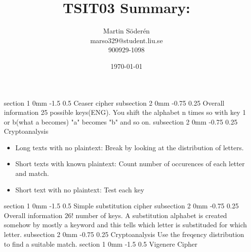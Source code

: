 \documentclass[a4paper,11pt]{article}
\makeatletter
\renewcommand{\section}{\@startsection
   {section}%
   {1}%
   {0mm}%
   {-1.5\baselineskip}%
   {0.5\baselineskip}%
   {\sffamily\bfseries\upshape\normalsize}}%
\renewcommand{\subsection}{\@startsection
   {subsection}%
   {2}%
   {0mm}%
   {-0.75\baselineskip}%
   {0.25\baselineskip}%
   {\rmfamily\normalfont\slshape\normalsize}}%
\makeatother
\begin{document}
\begin{titlepage}
\title{TSIT03 Summary:}
\author{Martin Söderén\\ marso329@student.liu.se\\900929-1098}
\date{\today}
\maketitle
\vfill %
\thispagestyle{empty}
\end{titlepage}
\section{Ceaser cipher}
\subsection{Overall information}
25 possible keys(ENG). You shift the alphabet n times so with key 1 or b(what a becomes) "a" becomes "b" and so on.
\subsection{Cryptoanalysis}
\begin{itemize}
\item Long texts with no plaintext: Break by looking at the distribution of letters. 
\item Short texts with known plaintext: Count number of occurences of each letter and match.
\item Short text with no plaintext: Test each key
\end{itemize}

\section{Simple substitution cipher}
\subsection{Overall information}
$26!$ number of keys. A substitution alphabet is created somehow by mostly a keyword and this tells which letter is substituded for which letter.
\subsection{Cryptoanalysis}
Use the freqency distribution to find a suitable match. 
\section{Vigenere Cipher}
\end{document}
